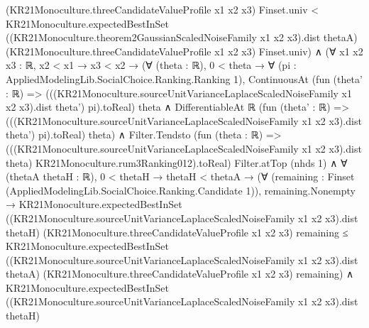 \documentclass[10pt]{article}
\begin{document}
\begin{ReviewVerbatim}
                                (KR21Monoculture.threeCandidateValueProfile x1 x2 x3) Finset.univ <
                              KR21Monoculture.expectedBestInSet
                                ((KR21Monoculture.theorem2GaussianScaledNoiseFamily x1 x2 x3).dist thetaA)
                                (KR21Monoculture.threeCandidateValueProfile x1 x2 x3) Finset.univ) ∧
          (∀ {x1 x2 x3 : ℝ},
              x2 < x1 →
                x3 < x2 →
                  (∀ (theta : ℝ),
                      0 < theta →
                        ∀ (pi : AppliedModelingLib.SocialChoice.Ranking.Ranking 1),
                          ContinuousAt
                              (fun (theta' : ℝ) =>
                                (((KR21Monoculture.sourceUnitVarianceLaplaceScaledNoiseFamily x1 x2 x3).dist theta')
                                    pi).toReal)
                              theta ∧
                            DifferentiableAt ℝ
                              (fun (theta' : ℝ) =>
                                (((KR21Monoculture.sourceUnitVarianceLaplaceScaledNoiseFamily x1 x2 x3).dist theta')
                                    pi).toReal)
                              theta) ∧
                    Filter.Tendsto
                        (fun (theta : ℝ) =>
                          (((KR21Monoculture.sourceUnitVarianceLaplaceScaledNoiseFamily x1 x2 x3).dist theta)
                              KR21Monoculture.rum3Ranking012).toReal)
                        Filter.atTop (nhds 1) ∧
                      ∀ (thetaA thetaH : ℝ),
                        0 < thetaH →
                          thetaH < thetaA →
                            (∀ (remaining : Finset (AppliedModelingLib.SocialChoice.Ranking.Candidate 1)),
                                remaining.Nonempty →
                                  KR21Monoculture.expectedBestInSet
                                      ((KR21Monoculture.sourceUnitVarianceLaplaceScaledNoiseFamily x1 x2 x3).dist
                                        thetaH)
                                      (KR21Monoculture.threeCandidateValueProfile x1 x2 x3) remaining ≤
                                    KR21Monoculture.expectedBestInSet
                                      ((KR21Monoculture.sourceUnitVarianceLaplaceScaledNoiseFamily x1 x2 x3).dist
                                        thetaA)
                                      (KR21Monoculture.threeCandidateValueProfile x1 x2 x3) remaining) ∧
                              KR21Monoculture.expectedBestInSet
                                  ((KR21Monoculture.sourceUnitVarianceLaplaceScaledNoiseFamily x1 x2 x3).dist thetaH)

\end{ReviewVerbatim}
\end{document}
